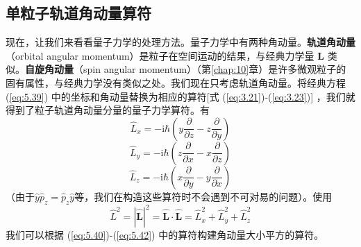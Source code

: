     \subsection*{单粒子轨道角动量算符}
    现在，让我们来看看量子力学的处理方法。量子力学中有两种角动量。\textbf{轨道角动量}（orbital angular momentum）是粒子在空间运动的结果，与经典力学量 $\mathbf{L}$ 类似。\textbf{自旋角动量}（spin angular momentum）（第\ref{chap:10}章）是许多微观粒子的固有属性，与经典力学没有类似之处。我们现在只考虑轨道角动量。将经典方程(\ref{eq:5.39}) 中的坐标和角动量替换为相应的算符[式 (\ref{eq:3.21})-(\ref{eq:3.23})] ，我们就得到了粒子轨道角动量分量的量子力学算符。有
    \begin{equation}
        \hat{L}_x = -\mathrm{i}\hbar\left(y\frac{\partial}{\partial z} - z\frac{\partial}{\partial y}\right)
        \label{eq:5.40}
    \end{equation}
    \begin{equation}
        \hat{L}_y = -\mathrm{i}\hbar\left(z\frac{\partial}{\partial x} - x\frac{\partial}{\partial z}\right)
        \label{eq:5.41}
    \end{equation}
    \begin{equation}
        \hat{L}_z = -\mathrm{i}\hbar\left(x\frac{\partial}{\partial y} - y\frac{\partial}{\partial x}\right)
        \label{eq:5.42}
    \end{equation}
    （由于$\hat{y}\hat{p}_z = \hat{p}_z\hat{y}$等，我们在构造这些算符时不会遇到不可对易的问题）。使用
    \begin{equation}
        \hat{L}^2 = \left|\hat{\mathbf{L}}\right|^2 = \hat{\mathbf{L}}\cdot\hat{\mathbf{L}} = \hat{L}_x^2 + \hat{L}_y^2 + \hat{L}_z^2
        \label{eq:5.43}
    \end{equation}
    我们可以根据 (\ref{eq:5.40})-(\ref{eq:5.42}) 中的算符构建角动量大小平方的算符。

